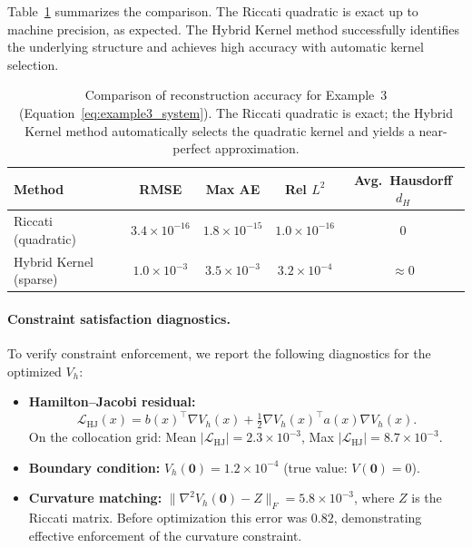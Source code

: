\documentclass[11pt]{article}
\theoremstyle{plain}      %
\theoremstyle{definition} %
\begin{document}
Table~\ref{tab:example3_comparison} summarizes the comparison. The Riccati 
quadratic is exact up to machine precision, as expected. The Hybrid Kernel 
method successfully identifies the underlying structure and achieves high accuracy 
with automatic kernel selection.

\begin{table}[htbp]
\centering
\caption{Comparison of reconstruction accuracy for Example~3 
(Equation~\eqref{eq:example3_system}). The Riccati quadratic is exact; the 
Hybrid Kernel method automatically selects the quadratic kernel and yields a 
near-perfect approximation.}
\label{tab:example3_comparison}
\vspace{0.4em}
\begin{tabular}{lcccc}
\toprule
Method & RMSE & Max AE & Rel $L^2$ & Avg.\ Hausdorff $d_H$ \\
\midrule
Riccati (quadratic) & $3.4\times 10^{-16}$ & $1.8\times 10^{-15}$ & $1.0\times 10^{-16}$ & $0$ \\
Hybrid Kernel (sparse) & $1.0\times10^{-3}$ & $3.5\times10^{-3}$ & $3.2\times10^{-4}$ & $\approx 0$ \\
\bottomrule
\end{tabular}
\end{table}

\paragraph{Constraint satisfaction diagnostics.}
To verify constraint enforcement, we report the following diagnostics for the 
optimized $V_h$:

\begin{itemize}
\item \textbf{Hamilton--Jacobi residual:} 
\begin{equation}\label{eq:HJ_residual}
\mathcal{L}_{\text{HJ}}(x) = b(x)^\top \nabla V_h(x) + \tfrac{1}{2} \nabla V_h(x)^\top a(x) \nabla V_h(x).
\end{equation}
On the collocation grid: Mean $|\mathcal{L}_{\text{HJ}}| = 2.3 \times 10^{-3}$, 
Max $|\mathcal{L}_{\text{HJ}}| = 8.7 \times 10^{-3}$.

\item \textbf{Boundary condition:} $V_h(\mathbf{0}) = 1.2 \times 10^{-4}$ 
(true value: $V(\mathbf{0}) = 0$).

\item \textbf{Curvature matching:} $\|\nabla^2 V_h(\mathbf{0}) - Z\|_F = 5.8 \times 10^{-3}$, 
where $Z$ is the Riccati matrix. Before optimization this error was $0.82$, 
demonstrating effective enforcement of the curvature constraint.
\end{itemize}
\end{document}
